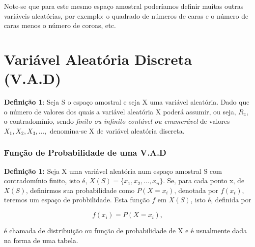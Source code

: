
Note-se que para este mesmo espaço amostral poderíamos definir
muitas outras variáveis aleatórias, por exemplo: o quadrado de
números de caras e o número de caras menos o número de coroas,
etc.


\section{Variável Aleatória Discreta (V.A.D)}

\textbf{Definição 1}: Seja S o espaço amostral e seja X uma
variável aleatória. Dado que o número de valores dos quais a
variável aleatória X poderá assumir, ou seja, $R_{x}$, o
contradomínio, sendo\emph{ finito ou infinito contável ou
enumerável} de valores $X_{1}, X_{2}, X_{3}, \ldots,$ denomina-se
X de variável aleatória discreta.

\subsubsection{Função de Probabilidade de uma V.A.D}

\textbf{Definição 1:} Seja X uma variável aleatória num espaço
amostral S com contradomínio finito, isto é, $X(S)=\{x_{1}, x_{2},
\ldots, x_{n} \}$. Se, para cada ponto x, de $X(S)$, definirmos
sua probabilidade como $P(X=x_{i})$, denotada por $f(x_{i})$,
teremos um espaço de probbilidade. Esta função $f$ em $X(S)$, isto
é, definida por


\begin{equation}\label{}
f(x_{i})=P(X=x_{i}),
\end{equation}

é chamada de distribuição ou função de probabilidade de X e é
usualmente dada na forma de uma tabela.


\begin{table}[!htb]
\end{table}


